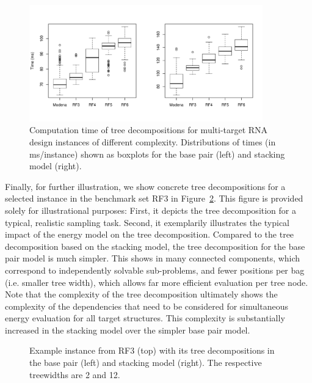 \documentclass[10pt]{article}
\makeatletter
\newlength{\@aligneps}
\newcommand{\includegraphicstop}[2][]{%
\sbox{\@alignepsbox}{\texttt{[image: \#2]}}%
\setlength{\@aligneps}{-\ht\@alignepsbox}%
\addtolength{\@aligneps}{2ex}%
\raisebox{\@aligneps}{\usebox{\@alignepsbox}}}
\newcommand{\revised}[1]{{\color{red} #1}}
\makeatother
\begin{document}
\begin{figure}[h!]
  \centering
  \includegraphics[width=0.9\textwidth]{Figs/td-times}
  \caption{Computation time of tree decompositions for
    multi-target RNA design instances of different complexity.
    Distributions of times (in ms/instance) shown as boxplots for the base pair (left) and stacking model (right).}
  \label{fig:td-times}
\end{figure}

\revised{
  Finally, for further illustration, we show concrete tree decompositions for a selected instance in the benchmark set RF3 in Figure~\ref{fig:td-example}. This figure is provided solely for illustrational purposes:
  First, it depicts the tree decomposition for a typical, realistic sampling task. Second, it exemplarily illustrates the typical impact of the energy model on the tree decomposition.
  Compared to the tree decomposition based on the stacking model, the tree decomposition for the base pair model is much simpler. This shows in many connected components, which correspond to independently solvable sub-problems, and fewer positions per bag (i.e. smaller tree width), which allows far more efficient evaluation per tree node. 
  Note that the complexity of the tree decomposition ultimately shows the complexity of the dependencies that need to be considered for simultaneous energy evaluation for all target structures. This complexity is substantially increased in the stacking model over the simpler base pair model.
}


\begin{figure}[h!]
  \centering
  
  \includegraphicstop[width=0.6\textwidth]{Figs/td-example-basepair}%
  \includegraphicstop[width=0.35\textwidth]{Figs/td-example-stacking}
  \caption{Example instance from RF3 (top) with its tree decompositions in the base pair (left) and stacking model (right). The respective treewidths are 2 and 12.}
  \label{fig:td-example}
\end{figure}
\end{document}
